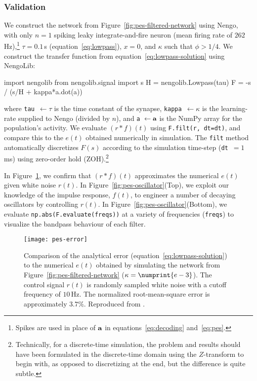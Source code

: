 \subsubsection{Validation}

We construct the network from Figure~\ref{fig:pes-filtered-network} using Nengo, with only $n = 1$ spiking leaky integrate-and-fire neuron (mean firing rate of $262\,$Hz),\footnote{%
Spikes are used in place of $\mathbf{a}$ in equations~\ref{eq:decoding} and~\ref{eq:pes}.} $\tau = 0.1\,$s (equation~\ref{eq:lowpass}), $x = 0$, and $\kappa$ such that $\phi > 1/4$.
We construct the transfer function from equation~\ref{eq:lowpass-solution} using NengoLib:
\begin{python}
import nengolib
from nengolib.signal import s
H = nengolib.Lowpass(tau)
F = -s / (s/H + kappa*a.dot(a))
\end{python}
where \texttt{tau}~$\leftarrow \tau$ is the time constant of the synapse, \texttt{kappa}~$\leftarrow \kappa$ is the learning-rate supplied to Nengo (divided by $n$), and \texttt{a}~$\leftarrow \mathbf{a}$ is the NumPy array for the population's activity.
We evaluate $(r \ast f)(t)$ using \texttt{F.filt(r, dt=dt)}, and compare this to the $e(t)$ obtained numerically in simulation.
The \texttt{filt} method automatically discretizes $F(s)$ according to the simulation time-step (\texttt{dt}~$= 1\,$ms) using zero-order hold (ZOH).\footnote{Technically, for a discrete-time simulation, the problem and results should have been formulated in the discrete-time domain using the $Z$-transform to begin with, as opposed to discretizing at the end, but the difference is quite subtle.}

In Figure~\ref{fig:pes-error}, we confirm that $(r \ast f)(t)$ approximates the numerical $e(t)$ given white noise $r(t)$.
In Figure~\ref{fig:pes-oscillator}(Top), we exploit our knowledge of the impulse response, $f(t)$, to engineer a number of decaying oscillators by controlling $r(t)$.
In Figure~\ref{fig:pes-oscillator}(Bottom), we evaluate \texttt{np.abs(F.evaluate(freqs))} at a variety of frequencies (\texttt{freqs}) to visualize the bandpass behaviour of each filter.

\begin{figure}
\centering
\texttt{[image: pes-error]}
\caption{ \label{fig:pes-error}
  Comparison of the analytical error (equation~\ref{eq:lowpass-solution}) to the numerical $e(t)$ obtained by simulating the network from Figure~\ref{fig:pes-filtered-network} ($\kappa = \numprint{e-3}$).
  The control signal $r(t)$ is randomly sampled white noise with a cutoff frequency of $10\,$Hz.
  The normalized root-mean-square error is approximately $3.7\%$.
  Reproduced from \citet[][Figure~2]{voelker2017c}.
}
\end{figure}

